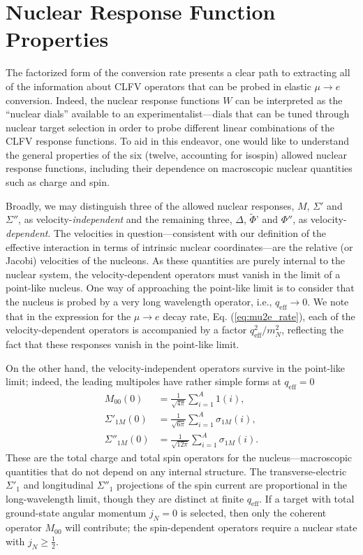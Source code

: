 \documentclass[12pt,letterpaper]{book}
\begin{document}
\chapter{Nuclear Response Function Properties}
\label{chap:nuclear_response}
\thispagestyle{headings}
The factorized form of the conversion rate presents a clear path to extracting all of the information about CLFV operators that can be probed in elastic $\mu\rightarrow e$ conversion. Indeed, the nuclear response functions $W$ can be interpreted as the ``nuclear dials'' available to an experimentalist---dials that can be tuned through nuclear target selection in order to probe different linear combinations of the CLFV response functions. To aid in this endeavor, one would like to understand the general properties of the six (twelve, accounting for isospin) allowed nuclear response functions, including their dependence on macroscopic nuclear quantities such as charge and spin.

Broadly, we may distinguish three of the allowed nuclear responses, $M$, $\Sigma'$ and $\Sigma''$, as velocity-\textit{independent} and the remaining three, $\Delta$, $\tilde{\Phi}$' and $\Phi''$, as velocity-\textit{dependent}. The velocities in question---consistent with our definition of the effective interaction in terms of intrinsic nuclear coordinates---are the relative (or Jacobi) velocities of the nucleons. As these quantities are purely internal to the nuclear system, the velocity-dependent operators must vanish in the limit of a point-like nucleus. One way of approaching the point-like limit is to consider that the nucleus is probed by a very long wavelength operator, i.e., $q_\mathrm{eff}\rightarrow 0$. We note that in the expression for the $\mu\rightarrow e$ decay rate, Eq. (\ref{eq:mu2e_rate}), each of the velocity-dependent operators is accompanied by a factor $q_\mathrm{eff}^2/m_N^2$, reflecting the fact that these responses vanish in the point-like limit. 

On the other hand, the velocity-independent operators survive in the point-like limit; indeed, the leading multipoles have rather simple forms at $q_\mathrm{eff}=0$
\begin{equation}
\begin{split}
M_{00}(0)&=\frac{1}{\sqrt{4\pi}}\sum_{i=1}^A 1(i),\\
\Sigma'_{1M}(0)&=\frac{1}{\sqrt{6\pi}}\sum_{i=1}^A\sigma_{1M}(i),\\
\Sigma''_{1M}(0)&=\frac{1}{\sqrt{12\pi}}\sum_{i=1}^A\sigma_{1M}(i).
\end{split}
\end{equation}
These are the total charge and total spin operators for the nucleus---macroscopic quantities that do not depend on any internal structure. The transverse-electric $\Sigma'_1$ and longitudinal $\Sigma''_1$ projections of the spin current are proportional in the long-wavelength limit, though they are distinct at finite $q_\mathrm{eff}$. If a target with total ground-state angular momentum $j_N=0$ is selected, then only the coherent operator $M_{00}$ will contribute; the spin-dependent operators require a nuclear state with $j_N\geq \frac{1}{2}$. 
\end{document}
